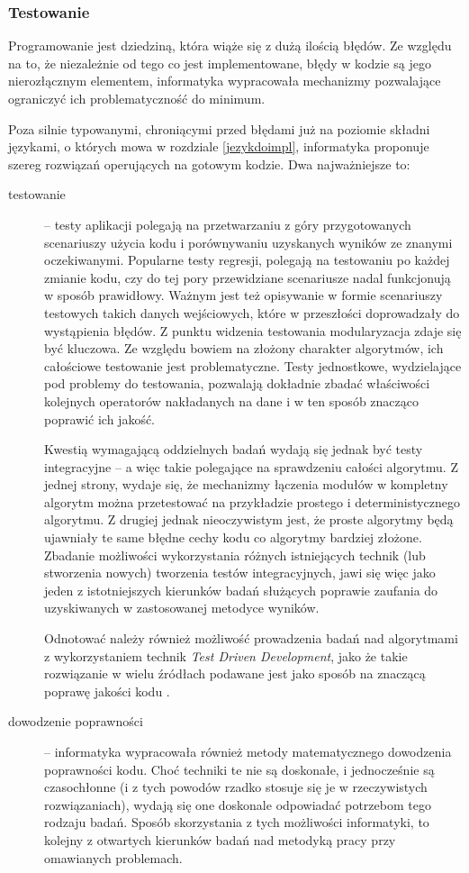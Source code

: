 \documentclass[12pt,a4paper]{report}
\begin{document}
{{{{{{\subsubsection{Testowanie}
\par{
Programowanie jest dziedziną, która wiąże się z dużą ilością błędów. Ze względu na to, że niezależnie od tego co jest implementowane, błędy w kodzie są jego nierozłącznym elementem, informatyka wypracowała mechanizmy pozwalające ograniczyć ich problematyczność do minimum.
}
\par{
Poza silnie typowanymi, chroniącymi przed błędami już na poziomie składni językami, o których mowa w rozdziale \ref{jezykdoimpl}, informatyka proponuje szereg rozwiązań operujących na gotowym kodzie. Dwa najważniejsze to:
\begin{description}
\item[testowanie] -- testy aplikacji polegają na przetwarzaniu z góry przygotowanych scenariuszy użycia kodu i porównywaniu uzyskanych wyników ze znanymi oczekiwanymi. Popularne testy regresji, polegają na testowaniu po każdej zmianie kodu, czy do tej pory przewidziane scenariusze nadal funkcjonują w sposób prawidłowy. Ważnym jest też opisywanie w formie scenariuszy testowych takich danych wejściowych, które w przeszłości doprowadzały do wystąpienia błędów. Z punktu widzenia testowania modularyzacja zdaje się być kluczowa. Ze względu bowiem na złożony charakter algorytmów, ich całościowe testowanie jest problematyczne. Testy jednostkowe, wydzielające pod problemy do testowania, pozwalają dokładnie zbadać właściwości kolejnych operatorów nakładanych na dane i w ten sposób znacząco poprawić ich jakość.
\par{
Kwestią wymagającą oddzielnych badań wydają się jednak być testy integracyjne -- a więc takie polegające na sprawdzeniu całości algorytmu. Z jednej strony, wydaje się, że mechanizmy łączenia modułów w kompletny algorytm można przetestować na przykładzie prostego i deterministycznego algorytmu. Z drugiej jednak nieoczywistym jest, że proste algorytmy będą ujawniały te same błędne cechy kodu co algorytmy bardziej złożone. Zbadanie możliwości wykorzystania różnych istniejących technik (lub stworzenia nowych) tworzenia testów integracyjnych, jawi się więc jako jeden z istotniejszych kierunków badań służących poprawie zaufania do uzyskiwanych w zastosowanej metodyce wyników.
}
\par{
Odnotować należy również możliwość prowadzenia badań nad algorytmami z wykorzystaniem technik \emph{Test Driven Development}, jako że takie rozwiązanie w wielu źródłach podawane jest jako sposób na znaczącą poprawę jakości kodu \cite{CleanCode}.
}
\item[dowodzenie poprawności] -- informatyka wypracowała również metody matematycznego dowodzenia poprawności kodu. Choć techniki te nie są doskonałe, i jednocześnie są czasochłonne (i z tych powodów rzadko stosuje się je w rzeczywistych rozwiązaniach), wydają się one doskonale odpowiadać potrzebom tego rodzaju badań. Sposób skorzystania z tych możliwości informatyki, to kolejny z otwartych kierunków badań nad metodyką pracy przy omawianych problemach.
\end{description}
}

}}}}}}
\end{document}
